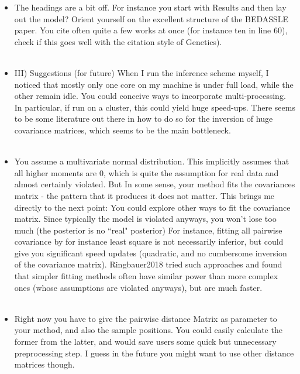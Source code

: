 \documentclass[11pt]{letter}
\newcommand{\gb}[1]{{\bf\color{black}{#1}}}
\begin{document}
\begin{itemize}
\item The headings are a bit off. 
For instance you start with Results and then lay out the model? 
Orient yourself on the excellent structure of the BEDASSLE paper.
 You cite often quite a few works at once (for instance ten in line 60), 
 check if this goes well with the citation style of Genetics).\\\\
\gb{RESPONSE.}

\item III) Suggestions (for future)
 When I run the inference scheme myself, 
 I noticed that mostly only one core on my machine is under full load, while the other remain idle. 
 You could conceive ways to incorporate multi-processing. 
 In particular, if run on a cluster, this could yield huge speed-ups. 
 There seems to be some literature out there in how to do so for the inversion of huge covariance matrices, 
 which seems to be the main bottleneck.\\\\
\gb{RESPONSE.}
 
 \item You assume a multivariate normal distribution. 
 This implicitly assumes that all higher moments are 0, 
 which is quite the assumption for real data and almost certainly violated. 
 But In some sense, your method fits the covariances matrix - the pattern that it produces it does not matter. 
 This brings me directly to the next point:
 You could explore other ways to fit the covariance matrix. 
 Since typically the model is violated anyways, 
 you won't lose too much (the posterior is no ``real" posterior)
For instance, fitting all pairwise covariance by for instance least square 
is not necessarily inferior, but could give you significant speed updates 
(quadratic, and no cumbersome inversion of the covariance matrix).
Ringbauer2018 tried such approaches and found 
that simpler fitting methods often have similar power than more complex ones 
(whose assumptions are violated anyways), but are much faster.\\\\
\gb{RESPONSE.}
 
 \item Right now you have to give the pairwise distance Matrix as parameter to your method, 
 and also the sample positions. 
 You could easily calculate the former from the latter, 
 and would save users some quick but unnecessary preprocessing step. 
 I guess in the future you might want to use other distance matrices though.\\\\
\gb{RESPONSE.}
 

\end{itemize}
\end{document}
